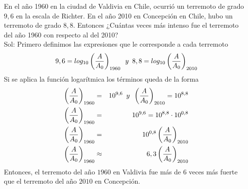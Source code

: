 \begin{mydef}
En el año 1960 en la ciudad de Valdivia en Chile, ocurrió un terremoto de grado $9,6$ en la escala de Richter. En el año 2010 en Concepción en Chile, hubo un terremoto de grado $8,8$. Entonces ¿Cuántas veces más intenso fue el terremoto del año 1960 con respecto al del 2010?\\

\noindent Sol: Primero definimos las expresiones que le corresponde a cada terremoto
\begin{eqnarray*}
9,6=log_{10}\left(\dfrac{A}{A_{0}}\right)_{1960} \hspace{5px} y \hspace{5px}8,8=log_{10}\left(\dfrac{A}{A_{0}}\right)_{2010}
\end{eqnarray*}
Si se aplica la función logarítmica los términos queda de la forma
\begin{eqnarray*}
\left(\dfrac{A}{A_{0}}\right)_{1960}&=&10^{9,6} \hspace{5px} y \hspace{5px} \left(\dfrac{A}{A_{0}}\right)_{2010} = 10^{8,8}\\
\left(\dfrac{A}{A_{0}}\right)_{1960}&=&10^{9,6}=10^{8,8}\cdot 10^{0,8}\\
\left(\dfrac{A}{A_{0}}\right)_{1960}&=&10^{0,8}\left(\dfrac{A}{A_{0}}\right)_{2010}\\
\left(\dfrac{A}{A_{0}}\right)_{1960}&\approx & 6,3\left(\dfrac{A}{A_{0}}\right)_{2010}
\end{eqnarray*}
Entonces, el terremoto del año $1960$ en Valdivia fue más de $6$ veces más fuerte que el terremoto del año $2010$ en Concepción.
\end{mydef}